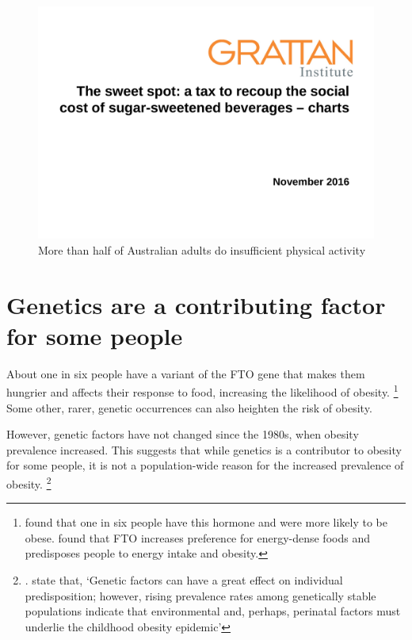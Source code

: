 \documentclass[embargoed]{grattan}
\begin{document}
\begin{figure}
\caption{More than half of Australian adults do insufficient physical activity}

\includegraphics[page=5]{atlas/ObesityCharts}


\end{figure}

\section{Genetics are a contributing factor for some people}\label{genetics-are-a-contributing-factor-for-some-people}

About one in six people have a variant of the FTO gene that makes them hungrier and affects their response to food, increasing the likelihood of obesity.%
\footnote{\textcite{Frayling2007commonvariantFTO} found that one in six people have this hormone and were more likely to be obese. \textcite{Karra2013linkFTOghrelin} found that FTO increases preference for energy-dense foods and predisposes people to energy intake and obesity.} Some other, rarer, genetic occurrences can also heighten the risk of obesity.

However, genetic factors have not changed since the 1980s, when obesity prevalence increased.
This suggests that while genetics is a contributor to obesity for some people, it is not a population-wide reason for the increased prevalence of obesity.%
\footnote{\textcite{Karra2013linkFTOghrelin}. \textcite{Ebbeling2002Childhoodobesitypublic} state that, `Genetic factors can have a great effect on individual predisposition; however, rising prevalence rates among genetically stable populations indicate that environmental and, perhaps, perinatal factors must underlie the childhood obesity epidemic'}
\end{document}

